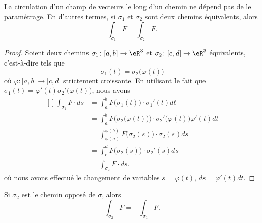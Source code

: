 \begin{proposition}
	La circulation d'un champ de vecteurs le long d'un chemin ne dépend pas de le paramétrage. En d'autres termes, si \( \sigma_1\) et \( \sigma_2\) sont deux chemins équivalents, alors
	\begin{equation}
		\int_{\sigma_1}F=\int_{\sigma_2}F.
	\end{equation}
\end{proposition}

\begin{proof}
	Soient deux chemins \( \sigma_1\colon \mathopen[ a , b \mathclose]\to \eR^3\) et \( \sigma_2\colon \mathopen[ c , d \mathclose]\to \eR^3\) équivalents, c'est-à-dire tels que
	\begin{equation}
		\sigma_1(t)=\sigma_2\big( \varphi(t) \big)
	\end{equation}
	où \( \varphi\colon \mathopen[ a , b \mathclose]\to \mathopen[ c , d \mathclose]\) strictement croissante. En utilisant le fait que \( \sigma_1(t)=\varphi'(t)\sigma_2'\big( \varphi(t) \big)\), nous avons
	\begin{equation}
		\begin{aligned}[]
			\int_{\sigma_1}F\cdot ds & =\int_a^bF\big( \sigma_1(t) \big)\cdot\sigma_1'(t)dt                                                  \\
			                         & =\int_a^bF\Big( \sigma_2\big( \varphi(t) \big) \Big)\cdot\sigma_2'\big( \varphi(t) \big)\varphi'(t)dt \\
			                         & =\int_{\varphi(a)}^{\varphi(b)}F\big( \sigma_2(s) \big)\cdot\sigma_2(s)ds                             \\
			                         & =\int_c^dF\big( \sigma_2(s) \big)\cdot \sigma_2'(s)ds                                                 \\
			                         & =\int_{\sigma_2}F\cdot ds.
		\end{aligned}
	\end{equation}
	où nous avons effectué le changement de variables \( s=\varphi(t)\), \( ds=\varphi'(t)dt\).
\end{proof}

\begin{remark}
	Si \( \sigma_2\) est le chemin opposé de \( \sigma\), alors
	\begin{equation}
		\int_{\sigma_2}F=-\int_{\sigma_1}F.
	\end{equation}
\end{remark}

